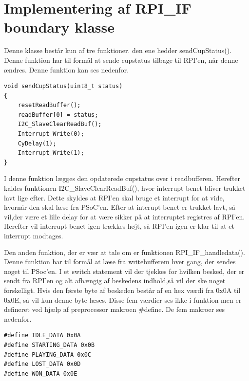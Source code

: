 \documentclass[Softwaredesign/Softwaredesign_main.tex]{subfiles}
\begin{document}
\section{Implementering af RPI\_IF boundary klasse}\label{sec:RPI_IF_implementering_bilag}
Denne klasse består kun af tre funktioner. den ene hedder sendCupStatus(). Denne funktion har til formål at sende cupstatus tilbage til RPI'en, når denne ændres. Denne funktion kan ses nedenfor.
\begin{lstlisting}
void sendCupStatus(uint8_t status)
{
    resetReadBuffer();
    readBuffer[0] = status;
    I2C_SlaveClearReadBuf();
    Interrupt_Write(0);
    CyDelay(1);
    Interrupt_Write(1);
}
\end{lstlisting}
I denne funktion lægges den opdaterede cupstatus over i readbufferen. Herefter kaldes funktionen I2C\_SlaveClearReadBuf(), hvor interrupt benet bliver trukket lavt lige efter. Dette skyldes at RPI'en skal bruge et interrupt for at vide, hvornår den skal læse fra PSoC'en. Efter at interupt benet er trukket lavt, så vil,der være et lille delay for at være sikker på at interruptet registres af RPI'en. Herefter vil interrupt benet igen trækkes højt, så RPI'en igen er klar til at et interrupt modtages. 

Den anden funktion, der er vær at tale om er funktionen RPI\_IF\_handledata(). Denne funktion har til formål at læse fra writebufferem hver gang, der sendes noget til PSoc'en. I et switch statement vil der tjekkes for hvilken besked, der er sendt fra RPI'en og alt afhængig af beskedens indhold,så vil der ske noget forskelligt. Hvis den første byte af beskeden består af en hex værdi fra 0x0A til 0x0E, så vil kun denne byte læses. Disse fem værdier ses ikke i funktion men er defineret ved hjælp af preprocessor makroen #define. De fem makroer ses nedenfor.
\begin{lstlisting}
#define IDLE_DATA 0x0A
#define STARTING_DATA 0x0B
#define PLAYING_DATA 0x0C
#define LOST_DATA 0x0D
#define WON_DATA 0x0E
\end{lstlisting}
\end{document}
